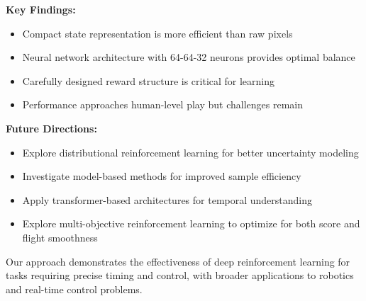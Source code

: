\documentclass[a1paper,portrait]{article}
\begin{document}
\begin{multicols}{3}
\textbf{Key Findings:}
\begin{itemize}
    \item Compact state representation is more efficient than raw pixels
    \item Neural network architecture with 64-64-32 neurons provides optimal balance
    \item Carefully designed reward structure is critical for learning
    \item Performance approaches human-level play but challenges remain
\end{itemize}

\textbf{Future Directions:}
\begin{itemize}
    \item Explore distributional reinforcement learning for better uncertainty modeling
    \item Investigate model-based methods for improved sample efficiency
    \item Apply transformer-based architectures for temporal understanding
    \item Explore multi-objective reinforcement learning to optimize for both score and flight smoothness
\end{itemize}

Our approach demonstrates the effectiveness of deep reinforcement learning for tasks requiring precise timing and control, with broader applications to robotics and real-time control problems.

\end{multicols}
\end{document}
